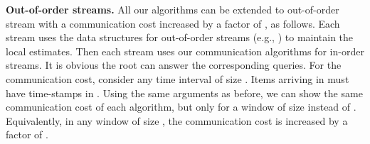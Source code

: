 \documentclass[proceedings]{stacs}
\theoremstyle{definition}\newtheorem{fact}{Fact}
\begin{document}
\vspace{.5ex}
{\bf Out-of-order streams.}
All our algorithms
can be extended to out-of-order stream with a communication cost increased
by a factor of , as follows.
Each stream uses the data structures for out-of-order streams
(e.g., \cite{BuschT07,CormodeKT08}) to maintain the local estimates.
Then each stream uses our communication algorithms for in-order streams.
It is obvious the root
can answer the corresponding queries.
For the communication cost,
consider any time interval  of size .
Items arriving in  must have time-stamps in .
Using the same arguments as before, we can show
the same communication cost of each algorithm,
but only for a window of size  instead of .
Equivalently, in any window of size ,
the communication cost is increased by a factor of .
\end{document}
